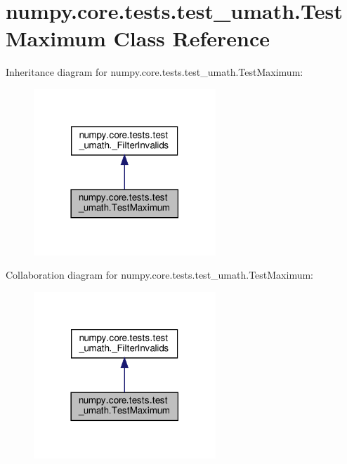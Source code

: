 \hypertarget{classnumpy_1_1core_1_1tests_1_1test__umath_1_1TestMaximum}{}\section{numpy.\+core.\+tests.\+test\+\_\+umath.\+Test\+Maximum Class Reference}
\label{classnumpy_1_1core_1_1tests_1_1test__umath_1_1TestMaximum}


Inheritance diagram for numpy.\+core.\+tests.\+test\+\_\+umath.\+Test\+Maximum\+:
\nopagebreak
\begin{figure}[H]
\begin{center}
\leavevmode
\includegraphics[width=194pt]{classnumpy_1_1core_1_1tests_1_1test__umath_1_1TestMaximum__inherit__graph}
\end{center}
\end{figure}


Collaboration diagram for numpy.\+core.\+tests.\+test\+\_\+umath.\+Test\+Maximum\+:
\nopagebreak
\begin{figure}[H]
\begin{center}
\leavevmode
\includegraphics[width=194pt]{classnumpy_1_1core_1_1tests_1_1test__umath_1_1TestMaximum__coll__graph}
\end{center}
\end{figure}
